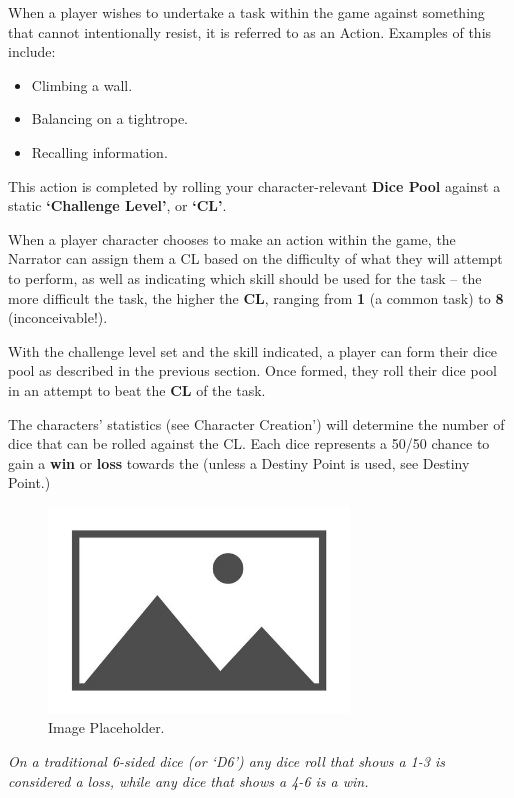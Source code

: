 When a player wishes to undertake a task within the game against something that cannot intentionally resist, it is referred to as an Action. Examples of this include:

\begin{itemize}
    \item Climbing a wall.
    \item Balancing on a tightrope.
    \item Recalling information.
\end{itemize}

This action is completed by rolling your character-relevant \textbf{Dice Pool} against a static \textbf{‘Challenge Level’}, or \textbf{‘CL’}.

When a player character chooses to make an action within the game, the Narrator can assign them a CL based on the difficulty of what they will attempt to perform, as well as indicating which skill should be used for the task – the more difficult the task, the higher the \textbf{CL}, ranging from \textbf{1} (a common task) to \textbf{8} (inconceivable!).

With the challenge level set and the skill indicated, a player can form their dice pool as described in the previous section. Once formed, they roll their dice pool in an attempt to beat the \textbf{CL} of the task.

The characters’ statistics (see Character Creation’) will determine the number of dice that can be rolled against the CL. Each dice represents a 50/50 chance to gain a \textbf{win} or \textbf{loss} towards the  (unless a Destiny Point is used, see Destiny Point.)

\begin{figure}[H]
    \includegraphics[width=8cm]{images/placeholder}
    \centering
    \caption{Image Placeholder.}
\end{figure}

\textit{On a traditional 6-sided dice (or ‘D6’) any dice roll that shows a 1-3 is considered a loss, while any dice that shows a 4-6 is a win.}

